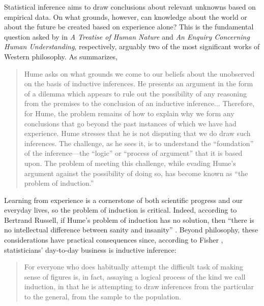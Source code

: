 \documentclass[a4paper, 12pt]{article}
\theoremstyle{plain}
\theoremstyle{definition}
\theoremstyle{remark}
\begin{document}
Statistical inference aims to draw conclusions about relevant unknowns based on empirical data.  On what grounds, however, can knowledge about the world or about the future be created based on experience alone?  This is the fundamental question asked by \citet{hume.treatise, hume.enquiry} in {\em A Treatise of Human Nature} and {\em An Enquiry Concerning Human Understanding}, respectively, arguably two of the most significant works of Western philosophy.  As \citet{sep.induction} summarizes,
\begin{quote}
Hume asks on what grounds we come to our beliefs about the unobserved on the basis of inductive inferences. He presents an argument in the form of a dilemma which appears to rule out the possibility of any reasoning from the premises to the conclusion of an inductive inference... 
Therefore, for Hume, the problem remains of how to explain why we form any conclusions that go beyond the past instances of which we have had experience. %
Hume stresses that he is not disputing that we do draw such inferences. The challenge, as he sees it, is to understand the ``foundation'' of the inference---the ``logic'' or ``process of argument'' that it is based upon. 
The problem of meeting this challenge, while evading Hume's argument against the possibility of doing so, has become known as ``the problem of induction.''
\end{quote}
Learning from experience is a cornerstone of both scientific progress and our everyday lives, so the problem of induction is critical.  Indeed, according to Bertrand Russell, if Hume's problem of induction has no solution, then ``there is no intellectual difference between sanity and insanity'' \citep[][p.~699]{russell.history}.  Beyond philosophy, these considerations have practical consequences since, according to Fisher \citep[quoted in][p.~448]{fisher.bio}, statisticians' day-to-day business is inductive inference:
\begin{quote}
For everyone who does habitually attempt the difficult task of making sense of figures is, in fact, assaying a logical process of the kind we call induction, in that he is attempting to draw inferences from the particular to the general, from the sample to the population. 
\end{quote}
\end{document}
